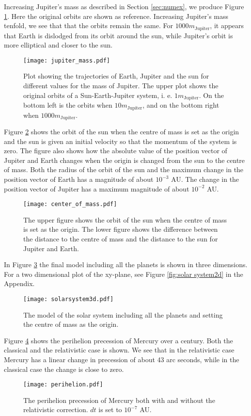 Increasing Jupiter's mass as described in Section \ref{sec:numex}, we produce Figure \ref{fig:jupiter mass}. Here the original orbits are shown as reference. Increasing Jupiter's mass tenfold, we see that that the orbits remain the same.
For $1000m_{\text{Jupiter}}$, it appears that Earth is dislodged from its orbit around the sun, while Jupiter's orbit is more elliptical and closer to the sun.
\begin{figure}[htbp]
	\centering
	\texttt{[image: jupiter\_mass.pdf]}
	\caption{Plot showing the trajectories of Earth, Jupiter and the sun for different values for the mass of Jupiter. The upper plot shows the original orbits of a Sun-Earth-Jupiter system, i. e. $1m_{\text{Jupiter}}$. On the bottom left is the orbits when $10m_{\text{Jupiter}}$, and on the bottom right when $1000m_{\text{Jupiter}}$.}
	\label{fig:jupiter mass}
\end{figure}

Figure \ref{fig:centre of mass} shows the orbit of the sun when the centre of mass is set as the origin and the sun is given an initial velocity so that the momentum of the system is zero. The figure also shows how the absolute value of the position vector of Jupiter and Earth changes when the origin is changed from the sun to the centre of mass. Both the radius of the orbit of the sun and the maximum change in the position vector of Earth has a magnitude of about $10^{-3}$ AU. The change in the position vector of Jupiter has a maximum magnitude of about $10^{-2}$ AU.
\begin{figure}[htbp]
	\centering
	\texttt{[image: center\_of\_mass.pdf]}
	\caption{The upper figure shows the orbit of the sun when the centre of mass is set as the origin. The lower figure shows the difference between the distance to the centre of mass and the distance to the sun for Jupiter and Earth.}
	\label{fig:centre of mass}
\end{figure}

In Figure \ref{fig:solar system} the final model including all the planets is shown in three dimensions. For a two dimensional plot of the xy-plane, see Figure \ref{fig:solar system2d} in the Appendix.
\begin{figure}[htbp]
	\centering
	\texttt{[image: solarsystem3d.pdf]}
	\caption{The model of the solar system including all the planets and setting the centre of mass as the origin.}
	\label{fig:solar system}
\end{figure}

Figure \ref{fig:perihelion} shows the perihelion precession of Mercury over a century. Both the classical and the relativistic case is shown. We see that in the relativistic case Mercury has a linear change in precession of about 43 arc seconds, while in the classical case the change is close to zero.
\begin{figure}[htbp]
	\centering
	\texttt{[image: perihelion.pdf]}
	\caption{The perihelion precession of Mercury both with and without the relativistic correction. $dt$ is set to $10^{-7}$ AU.}
	\label{fig:perihelion}
\end{figure}
